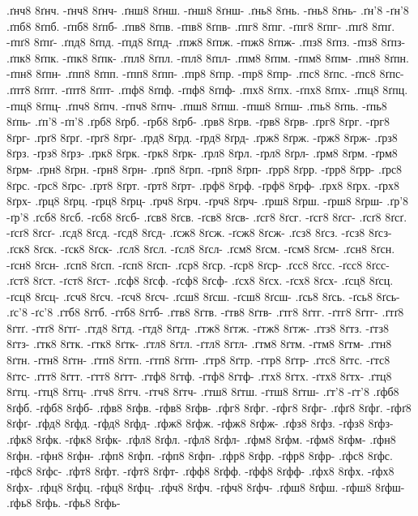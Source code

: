 {.ґнч8 8ґнч. -ґнч8 8ґнч-
.ґнш8 8ґнш. -ґнш8 8ґнш-
.ґнь8 8ґнь. -ґнь8 8ґнь-
.ґн'8 -ґн'8
.ґпб8 8ґпб. -ґпб8 8ґпб-
.ґпв8 8ґпв. -ґпв8 8ґпв-
.ґпг8 8ґпг. -ґпг8 8ґпг-
.ґпґ8 8ґпґ. -ґпґ8 8ґпґ-
.ґпд8 8ґпд. -ґпд8 8ґпд-
.ґпж8 8ґпж. -ґпж8 8ґпж-
.ґпз8 8ґпз. -ґпз8 8ґпз-
.ґпк8 8ґпк. -ґпк8 8ґпк-
.ґпл8 8ґпл. -ґпл8 8ґпл-
.ґпм8 8ґпм. -ґпм8 8ґпм-
.ґпн8 8ґпн. -ґпн8 8ґпн-
.ґпп8 8ґпп. -ґпп8 8ґпп-
.ґпр8 8ґпр. -ґпр8 8ґпр-
.ґпс8 8ґпс. -ґпс8 8ґпс-
.ґпт8 8ґпт. -ґпт8 8ґпт-
.ґпф8 8ґпф. -ґпф8 8ґпф-
.ґпх8 8ґпх. -ґпх8 8ґпх-
.ґпц8 8ґпц. -ґпц8 8ґпц-
.ґпч8 8ґпч. -ґпч8 8ґпч-
.ґпш8 8ґпш. -ґпш8 8ґпш-
.ґпь8 8ґпь. -ґпь8 8ґпь-
.ґп'8 -ґп'8
.ґрб8 8ґрб. -ґрб8 8ґрб-
.ґрв8 8ґрв. -ґрв8 8ґрв-
.ґрг8 8ґрг. -ґрг8 8ґрг-
.ґрґ8 8ґрґ. -ґрґ8 8ґрґ-
.ґрд8 8ґрд. -ґрд8 8ґрд-
.ґрж8 8ґрж. -ґрж8 8ґрж-
.ґрз8 8ґрз. -ґрз8 8ґрз-
.ґрк8 8ґрк. -ґрк8 8ґрк-
.ґрл8 8ґрл. -ґрл8 8ґрл-
.ґрм8 8ґрм. -ґрм8 8ґрм-
.ґрн8 8ґрн. -ґрн8 8ґрн-
.ґрп8 8ґрп. -ґрп8 8ґрп-
.ґрр8 8ґрр. -ґрр8 8ґрр-
.ґрс8 8ґрс. -ґрс8 8ґрс-
.ґрт8 8ґрт. -ґрт8 8ґрт-
.ґрф8 8ґрф. -ґрф8 8ґрф-
.ґрх8 8ґрх. -ґрх8 8ґрх-
.ґрц8 8ґрц. -ґрц8 8ґрц-
.ґрч8 8ґрч. -ґрч8 8ґрч-
.ґрш8 8ґрш. -ґрш8 8ґрш-
.ґр'8 -ґр'8
.ґсб8 8ґсб. -ґсб8 8ґсб-
.ґсв8 8ґсв. -ґсв8 8ґсв-
.ґсг8 8ґсг. -ґсг8 8ґсг-
.ґсґ8 8ґсґ. -ґсґ8 8ґсґ-
.ґсд8 8ґсд. -ґсд8 8ґсд-
.ґсж8 8ґсж. -ґсж8 8ґсж-
.ґсз8 8ґсз. -ґсз8 8ґсз-
.ґск8 8ґск. -ґск8 8ґск-
.ґсл8 8ґсл. -ґсл8 8ґсл-
.ґсм8 8ґсм. -ґсм8 8ґсм-
.ґсн8 8ґсн. -ґсн8 8ґсн-
.ґсп8 8ґсп. -ґсп8 8ґсп-
.ґср8 8ґср. -ґср8 8ґср-
.ґсс8 8ґсс. -ґсс8 8ґсс-
.ґст8 8ґст. -ґст8 8ґст-
.ґсф8 8ґсф. -ґсф8 8ґсф-
.ґсх8 8ґсх. -ґсх8 8ґсх-
.ґсц8 8ґсц. -ґсц8 8ґсц-
.ґсч8 8ґсч. -ґсч8 8ґсч-
.ґсш8 8ґсш. -ґсш8 8ґсш-
.ґсь8 8ґсь. -ґсь8 8ґсь-
.ґс'8 -ґс'8
.ґтб8 8ґтб. -ґтб8 8ґтб-
.ґтв8 8ґтв. -ґтв8 8ґтв-
.ґтг8 8ґтг. -ґтг8 8ґтг-
.ґтґ8 8ґтґ. -ґтґ8 8ґтґ-
.ґтд8 8ґтд. -ґтд8 8ґтд-
.ґтж8 8ґтж. -ґтж8 8ґтж-
.ґтз8 8ґтз. -ґтз8 8ґтз-
.ґтк8 8ґтк. -ґтк8 8ґтк-
.ґтл8 8ґтл. -ґтл8 8ґтл-
.ґтм8 8ґтм. -ґтм8 8ґтм-
.ґтн8 8ґтн. -ґтн8 8ґтн-
.ґтп8 8ґтп. -ґтп8 8ґтп-
.ґтр8 8ґтр. -ґтр8 8ґтр-
.ґтс8 8ґтс. -ґтс8 8ґтс-
.ґтт8 8ґтт. -ґтт8 8ґтт-
.ґтф8 8ґтф. -ґтф8 8ґтф-
.ґтх8 8ґтх. -ґтх8 8ґтх-
.ґтц8 8ґтц. -ґтц8 8ґтц-
.ґтч8 8ґтч. -ґтч8 8ґтч-
.ґтш8 8ґтш. -ґтш8 8ґтш-
.ґт'8 -ґт'8
.ґфб8 8ґфб. -ґфб8 8ґфб-
.ґфв8 8ґфв. -ґфв8 8ґфв-
.ґфг8 8ґфг. -ґфг8 8ґфг-
.ґфґ8 8ґфґ. -ґфґ8 8ґфґ-
.ґфд8 8ґфд. -ґфд8 8ґфд-
.ґфж8 8ґфж. -ґфж8 8ґфж-
.ґфз8 8ґфз. -ґфз8 8ґфз-
.ґфк8 8ґфк. -ґфк8 8ґфк-
.ґфл8 8ґфл. -ґфл8 8ґфл-
.ґфм8 8ґфм. -ґфм8 8ґфм-
.ґфн8 8ґфн. -ґфн8 8ґфн-
.ґфп8 8ґфп. -ґфп8 8ґфп-
.ґфр8 8ґфр. -ґфр8 8ґфр-
.ґфс8 8ґфс. -ґфс8 8ґфс-
.ґфт8 8ґфт. -ґфт8 8ґфт-
.ґфф8 8ґфф. -ґфф8 8ґфф-
.ґфх8 8ґфх. -ґфх8 8ґфх-
.ґфц8 8ґфц. -ґфц8 8ґфц-
.ґфч8 8ґфч. -ґфч8 8ґфч-
.ґфш8 8ґфш. -ґфш8 8ґфш-
.ґфь8 8ґфь. -ґфь8 8ґфь-
}
